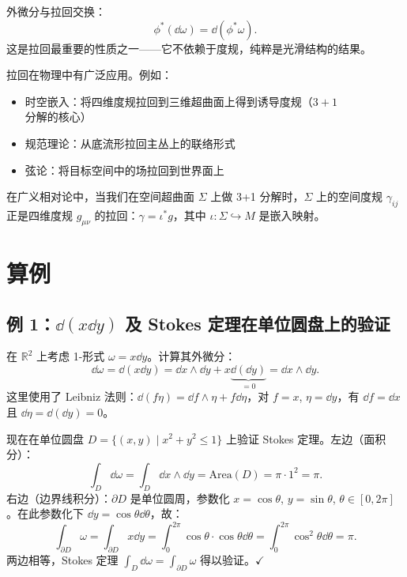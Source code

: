 \begin{property}[拉回与外微分交换]
外微分与拉回交换：
\begin{equation}
    \phi^*(\dd\omega) = \dd(\phi^* \omega).
\end{equation}
这是拉回最重要的性质之一——它不依赖于度规，纯粹是光滑结构的结果。
\end{property}

\begin{note}[物理意义]
拉回在物理中有广泛应用。例如：
\begin{itemize}
    \item 时空嵌入：将四维度规拉回到三维超曲面上得到诱导度规（$3+1$ 分解的核心）
    \item 规范理论：从底流形拉回主丛上的联络形式
    \item 弦论：将目标空间中的场拉回到世界面上
\end{itemize}
在广义相对论中，当我们在空间超曲面 $\Sigma$ 上做 3+1 分解时，$\Sigma$ 上的空间度规 $\gamma_{ij}$ 正是四维度规 $g_{\mu\nu}$ 的拉回：$\gamma = \iota^* g$，其中 $\iota: \Sigma \hookrightarrow M$ 是嵌入映射。
\end{note}

\section{算例}

\subsection{例 1：$\dd(x \dd y)$ 及 Stokes 定理在单位圆盘上的验证}

在 $\mathbb{R}^2$ 上考虑 1-形式 $\omega = x \dd y$。计算其外微分：
\begin{equation}
    \dd\omega = \dd(x \dd y) = \dd x \wedge \dd y + x \underbrace{\dd(\dd y)}_{=0} = \dd x \wedge \dd y.
\end{equation}
这里使用了 Leibniz 法则：$\dd(f \eta) = \dd f \wedge \eta + f \dd\eta$，对 $f = x$, $\eta = \dd y$，有 $\dd f = \dd x$ 且 $\dd\eta = \dd(\dd y) = 0$。

现在在单位圆盘 $D = \{(x,y) \mid x^2 + y^2 \leq 1\}$ 上验证 Stokes 定理。左边（面积分）：
\begin{equation}
    \int_D \dd\omega = \int_D \dd x \wedge \dd y = \text{Area}(D) = \pi \cdot 1^2 = \pi.
\end{equation}
右边（边界线积分）：$\partial D$ 是单位圆周，参数化 $x = \cos\theta$, $y = \sin\theta$, $\theta \in [0, 2\pi]$。在此参数化下 $\dd y = \cos\theta \dd\theta$，故：
\begin{equation}
    \int_{\partial D} \omega = \int_{\partial D} x \dd y = \int_0^{2\pi} \cos\theta \cdot \cos\theta \dd\theta = \int_0^{2\pi} \cos^2\theta \dd\theta = \pi.
\end{equation}
两边相等，Stokes 定理 $\int_D \dd\omega = \int_{\partial D} \omega$ 得以验证。$\checkmark$

